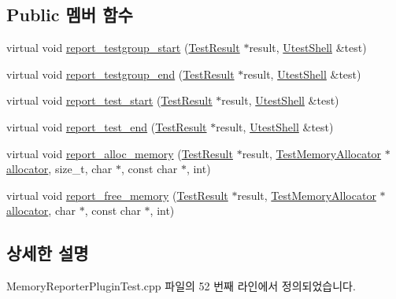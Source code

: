 \subsection*{Public 멤버 함수}
\begin{DoxyCompactItemize}
\item 
virtual void \hyperlink{class_mock_memory_report_formatter_a92e1ff68cbfdf8da417eb8ae4fee6288}{report\+\_\+testgroup\+\_\+start} (\hyperlink{class_test_result}{Test\+Result} $\ast$result, \hyperlink{class_utest_shell}{Utest\+Shell} \&test)
\item 
virtual void \hyperlink{class_mock_memory_report_formatter_a8e6e205c7d958ab4aa1637b06c4b2e29}{report\+\_\+testgroup\+\_\+end} (\hyperlink{class_test_result}{Test\+Result} $\ast$result, \hyperlink{class_utest_shell}{Utest\+Shell} \&test)
\item 
virtual void \hyperlink{class_mock_memory_report_formatter_aee2838d019f2f21ca0caa4ef3e999265}{report\+\_\+test\+\_\+start} (\hyperlink{class_test_result}{Test\+Result} $\ast$result, \hyperlink{class_utest_shell}{Utest\+Shell} \&test)
\item 
virtual void \hyperlink{class_mock_memory_report_formatter_aa25cde658728a8e3d7ed5b4dfa27ce94}{report\+\_\+test\+\_\+end} (\hyperlink{class_test_result}{Test\+Result} $\ast$result, \hyperlink{class_utest_shell}{Utest\+Shell} \&test)
\item 
virtual void \hyperlink{class_mock_memory_report_formatter_a4b17c4ac90408a2747d81473d6b4dda6}{report\+\_\+alloc\+\_\+memory} (\hyperlink{class_test_result}{Test\+Result} $\ast$result, \hyperlink{class_test_memory_allocator}{Test\+Memory\+Allocator} $\ast$\hyperlink{_memory_leak_warning_test_8cpp_a83fc2e9b9142613f7df2bcc3ff8292bc}{allocator}, size\+\_\+t, char $\ast$, const char $\ast$, int)
\item 
virtual void \hyperlink{class_mock_memory_report_formatter_aca6b0c6354d4fdebe4d028ec89726805}{report\+\_\+free\+\_\+memory} (\hyperlink{class_test_result}{Test\+Result} $\ast$result, \hyperlink{class_test_memory_allocator}{Test\+Memory\+Allocator} $\ast$\hyperlink{_memory_leak_warning_test_8cpp_a83fc2e9b9142613f7df2bcc3ff8292bc}{allocator}, char $\ast$, const char $\ast$, int)
\end{DoxyCompactItemize}


\subsection{상세한 설명}


Memory\+Reporter\+Plugin\+Test.\+cpp 파일의 52 번째 라인에서 정의되었습니다.



